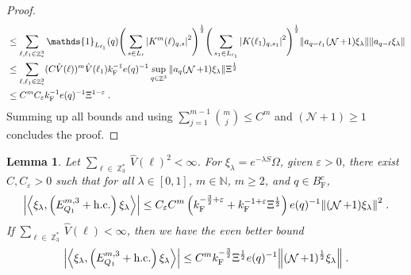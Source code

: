 \documentclass[12pt,a4paper]{article}
\numberwithin{equation}{section}
\newcommand{\cN}{\mathcal{N}}
\newcommand{\NNN}{\mathbb{N}}
\newcommand{\1}{\mathbb{I}}
\newcommand{\F}{\mathrm{F}}
\DeclareMathOperator{\Z}{\mathbb{Z}}
\DeclareMathOperator{\NN}{\mathcal{N}}
\newcommand{\half}{\frac{1}{2}}
\newcommand{\eva}[1]{\left\langle #1 \right\rangle}
\theoremstyle{plain}
\newtheorem{lemma}[theorem]{Lemma}
\theoremstyle{definition}
\theoremstyle{remark}
\theoremstyle{plain}
\theoremstyle{definition}
\theoremstyle{remark}
\begin{document}
\begin{proof}
{\begin{align}
	&\leq \sum_{\ell,\ell_1 \in \Z^3_*} \mathds{1}_{L_{\ell_1}}(q)
		\Bigg(\sum\limits_{s \in L_{\ell}} \abs{K^m(\ell)_{q,s}}^2\Bigg)^\half \Bigg(\sum\limits_{s_1 \in L_{\ell_1}} \abs{K(\ell_1)_{q,s_1}}^2\Bigg)^\half \norm{ a_{q-\ell_1} (\NN+1)\xi_\lambda} \norm{ a_{q-\ell}\xi_\lambda }\nonumber\\
	&\leq \sum_{\ell,\ell_1 \in \Z^3_*} (C \hat{V}(\ell))^m \hat{V}(\ell_1) k_{\F}^{-1} e(q)^{-1} \sup_{q \in \Z^3}\norm{ a_{q} (\NN+1) \xi_\lambda}\Xi^\half\nonumber\\
	&\leq C^m C_\varepsilon k_{\F}^{-1} e(q)^{-1} \Xi^{1-\varepsilon} \;. \label{eq:estEQ1113}
\end{align}
}
Summing up all bounds and using $\sum_{j=1}^{m-1} {{m}\choose j} \le C^m $ and $ (\cN+1) \ge 1 $ concludes the proof.
\end{proof}



\begin{lemma} \label{lem:EQ112}
Let $ \sum_{\ell \in \Z_3^*} \hat{V}(\ell)^2 < \infty $. For $\xi_\lambda = e^{-\lambda S} \Omega$, given $ \varepsilon > 0 $, there exist $ C, C_\varepsilon > 0 $ such that for all $ \lambda \in [0,1] $, $ m \in \NNN $, $ m \ge 2 $, and $ q \in B_{\F}^c $,
\begin{equation} \label{eq:estEQ112_Coulomb}
\begin{aligned}
	\abs{\eva{\xi_\lambda,\left(E^{m,3}_{Q_1}+\mathrm{h.c.}\right) \xi_\lambda }}\nonumber
	\leq C_\varepsilon C^m \left( k_{\F}^{-\frac 32 + \varepsilon}
		+ k_{\F}^{-1 + \varepsilon} \Xi^\half \right)
		e(q)^{-1}
		\norm{(\NN+1) \xi_\lambda }^2 \;.
\end{aligned}
\end{equation}
If $ \sum_{\ell \in \Z_3^*} \hat{V}(\ell) < \infty $, then we have the even better bound
\begin{equation} \label{eq:estEQ112}
\begin{aligned}
	\abs{\eva{\xi_\lambda,\left(E^{m,3}_{Q_1}+\mathrm{h.c.}\right) \xi_\lambda }}\nonumber
	\leq C^m k_{\F}^{-\frac{3}{2}} \Xi^{\half} e(q)^{-1}
		\norm{(\NN+1)^\half \xi_\lambda } \;.
\end{aligned}
\end{equation}
\end{lemma}
\end{document}
